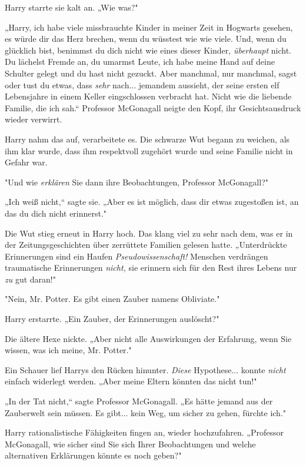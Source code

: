{Harry starrte sie kalt an. „Wie was?"

„Harry, ich habe viele missbrauchte Kinder in meiner Zeit in Hogwarts gesehen, es würde dir das Herz brechen, wenn du wüsstest wie wie viele. Und, wenn du glücklich bist, benimmst du dich nicht wie eines dieser Kinder, \emph{überhaupt} nicht. Du lächelst Fremde an, du umarmst Leute, ich habe meine Hand auf deine Schulter gelegt und du hast nicht gezuckt. Aber manchmal, nur manchmal, sagst oder tust du etwas, dass \emph{sehr} nach... jemandem aussieht, der seine ersten elf Lebensjahre in einem Keller eingschlossen verbracht hat. Nicht wie die liebende Familie, die ich sah.“ Professor McGonagall neigte den Kopf, ihr Gesichtsausdruck wieder verwirrt.

Harry nahm das auf, verarbeitete es. Die schwarze Wut begann zu weichen, als ihm klar wurde, dass ihm respektvoll zugehört wurde und seine Familie nicht in Gefahr war.

"Und wie \emph{erklären} Sie dann ihre Beobachtungen, Professor McGonagall?"

„Ich weiß nicht,“ sagte sie. „Aber es ist möglich, dass dir etwas zugestoßen ist, an das du dich nicht erinnerst."

Die Wut stieg erneut in Harry hoch. Das klang viel zu sehr nach dem, was er in der Zeitungsgeschichten über zerrüttete Familien gelesen hatte. „Unterdrückte Erinnerungen sind ein Haufen \emph{Pseudowissenschaft!} Menschen verdrängen traumatische Erinnerungen \emph{nicht,} sie erinnern sich für den Rest ihres Lebens nur \emph{zu} gut daran!"

"Nein, Mr. Potter. Es gibt einen Zauber namens Obliviate."

Harry erstarrte. „Ein Zauber, der Erinnerungen auslöscht?"

Die ältere Hexe nickte. „Aber nicht alle Auswirkungen der Erfahrung, wenn Sie wissen, was ich meine, Mr. Potter."

Ein Schauer lief Harrys den Rücken hinunter. \emph{Diese} Hypothese... konnte \emph{nicht} einfach widerlegt werden. „Aber meine Eltern könnten das nicht tun!"

„In der Tat nicht,“ sagte Professor McGonagall. „Es hätte jemand aus der Zauberwelt sein müssen. Es gibt... kein Weg, um sicher zu gehen, fürchte ich."

Harry rationalistische Fähigkeiten fingen an, wieder hochzufahren. „Professor McGonagall, wie sicher sind Sie sich Ihrer Beobachtungen und welche alternativen Erklärungen könnte es noch geben?"

}

